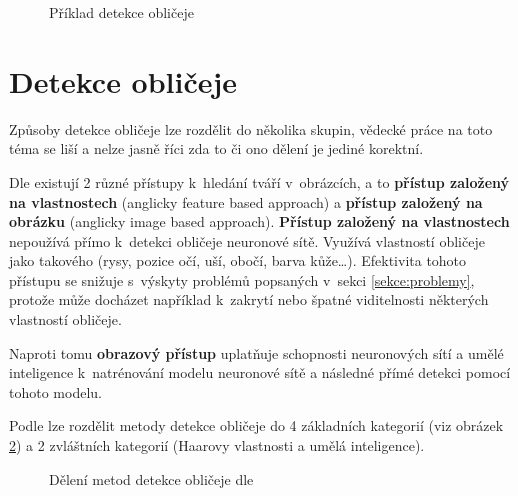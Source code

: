 \begin{figure}[H]
  \begin{center}
  \label{fdexample}
  \caption{Příklad detekce obličeje}
  \end{center}
\end{figure}

\section{Detekce obličeje}
Způsoby detekce obličeje lze rozdělit do několika skupin, vědecké práce na toto téma se liší a nelze jasně říci zda to či ono dělení je jediné korektní.

Dle \cite{fdReview} existují 2 různé přístupy k~hledání tváří v~obrázcích, a to \textbf{přístup založený na vlastnostech} (anglicky feature based approach) a \textbf{přístup založený na obrázku} (anglicky image based approach). 
\textbf{Přístup založený na vlastnostech} nepoužívá přímo k~detekci obličeje neuronové sítě. Využívá vlastností obličeje jako takového (rysy, pozice očí, uší, obočí, barva kůže\dots). Efektivita tohoto přístupu se snižuje s~výskyty problémů popsaných v~sekci \ref{sekce:problemy}, protože může docházet například k~zakrytí nebo špatné viditelnosti některých vlastností obličeje.

Naproti tomu \textbf{obrazový přístup} uplatňuje schopnosti neuronových sítí a umělé inteligence k~natrénování modelu neuronové sítě a následné přímé detekci pomocí tohoto modelu. 

Podle \cite{feature-based-fd-review} lze rozdělit metody detekce obličeje do 4 základních kategorií (viz obrázek \ref{fddeleni}) a 2 zvláštních kategorií (Haarovy vlastnosti a umělá inteligence).
\begin{figure}[H]
  \begin{center}
  \label{fddeleni}
  \caption{Dělení metod detekce obličeje dle \cite{feature-based-fd-review}}
  \end{center}
\end{figure}

